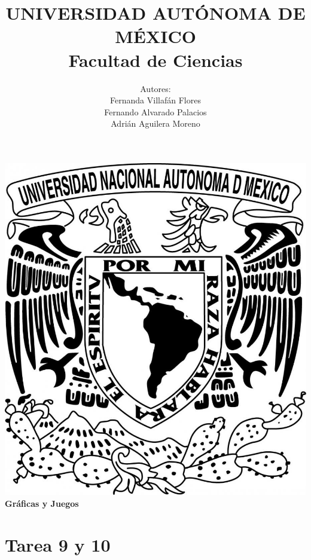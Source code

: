 \documentclass{article}
\begin{document}
\title{UNIVERSIDAD AUT\'ONOMA DE M\'EXICO\\ Facultad de Ciencias}
\author{Autores:
  \\ Fernanda Villaf\'an Flores
  \\ Fernando Alvarado Palacios
  \\ Adri\'an Aguilera Moreno}
\date{}
\maketitle
\begin{center}
  \includegraphics[scale=0.20]{../Imagen/Portada.jpg}\\[0.4cm]
  \Large
  \bf{Gr\'aficas y Juegos}
  \normalsize
\end{center}
\newpage
{}
\section*{\LARGE{Tarea 9 y 10}}
\end{document}
